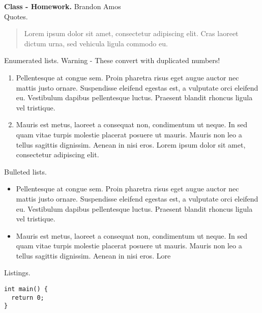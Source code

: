\documentclass[12pt]{hwdoc}
\begin{document}
\headerline{\today}
{\bf Class - Homework.}
{Brandon Amos} \\

Quotes.
\begin{quote}
  Lorem ipsum dolor sit amet, consectetur adipiscing elit. Cras laoreet 
  dictum urna, sed vehicula ligula commodo eu.
\end{quote}

Enumerated lists. Warning - These convert with duplicated numbers!
\begin{enumerate}
  \item Pellentesque at congue sem. Proin pharetra risus 
    eget augue auctor nec mattis justo ornare. Suspendisse eleifend 
    egestas est, a vulputate orci eleifend eu. Vestibulum dapibus 
    pellentesque luctus. Praesent blandit rhoncus ligula vel tristique. 
  \item Mauris est metus, laoreet a consequat non, condimentum ut neque. In 
    sed quam vitae turpis molestie placerat posuere ut mauris. Mauris non leo a
    tellus sagittis dignissim. Aenean in nisi eros.
    Lorem ipsum dolor sit amet, consectetur adipiscing elit.
\end{enumerate}

Bulleted lists.
\begin{itemize}
  \item Pellentesque at congue sem. Proin pharetra risus 
    eget augue auctor nec mattis justo ornare. Suspendisse eleifend 
    egestas est, a vulputate orci eleifend eu. Vestibulum dapibus 
    pellentesque luctus. Praesent blandit rhoncus ligula vel tristique. 
  \item Mauris est metus, laoreet a consequat non, condimentum ut neque. In 
    sed quam vitae turpis molestie placerat posuere ut mauris. Mauris non leo a
    tellus sagittis dignissim. Aenean in nisi eros.
    Lore
\end{itemize}

Listings.
\begin{lstlisting}
int main() {
  return 0;
}
\end{lstlisting}
\end{document}
